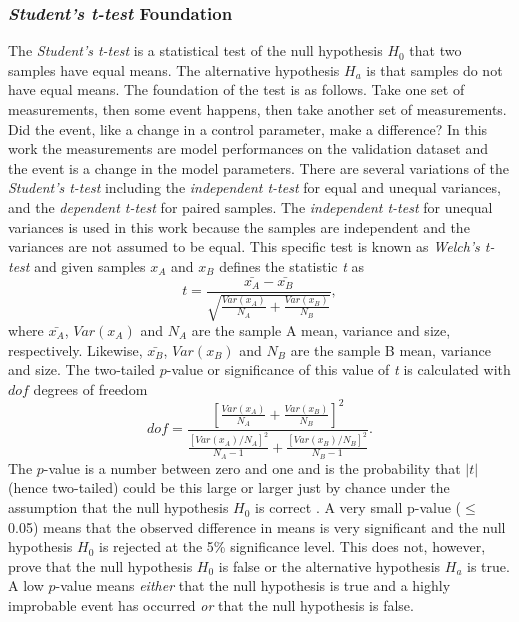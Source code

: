\subsubsection{\textit{Student's t-test} Foundation}
\label{sec:students_t-test}
The \textit{Student's t-test} is a statistical test of the null hypothesis $H_{0}$ that two samples have equal means. The alternative hypothesis $H_{a}$ is that samples do not have equal means. The foundation of the test is as follows. Take one set of measurements, then some event happens, then take another set of measurements. Did the event, like a change in a control parameter, make a difference? In this work the measurements are model performances on the validation dataset and the event is a change in the model parameters. There are several variations of the \textit{Student's t-test} including the \textit{independent t-test} for equal and unequal variances, and the \textit{dependent t-test} for paired samples. The \textit{independent t-test} for unequal variances is used in this work because the samples are independent and the variances are not assumed to be equal. This specific test is known as \textit{Welch's t-test} and given samples $x_{A}$ and $x_{B}$ defines the statistic \textit{t} as
\begin{equation} \label{eq:t_stat}
	t = \frac{\bar{x_{A}} - \bar{x_{B}}}{\sqrt{\frac{Var(x_{A})}{N_{A}} + \frac{Var(x_{B})}{N_{B}}}},
\end{equation}
where $\bar{x_{A}}$, $Var(x_{A})$ and $N_{A}$ are the sample A mean, variance and size, respectively. Likewise, $\bar{x_{B}}$, $Var(x_{B})$ and $N_{B}$ are the sample B mean, variance and size. The two-tailed $p$-value or significance of this value of \textit{t} is calculated with $dof$ degrees of freedom
\begin{equation} \label{eq:t_dof}
	dof = \frac{\left[\frac{Var(x_{A})}{N_{A}} + \frac{Var(x_{B})}{N_{B}}\right]^{2}}{\frac{\left[Var(x_{A})/N_{A}\right]^{2}}{N_{A} - 1} + \frac{\left[Var(x_{B})/N_{B}\right]^{2}}{N_{B} - 1}}.
\end{equation}
The $p$-value is a number between zero and one and is the probability that $|t|$ (hence two-tailed) could be this large or larger just by chance under the assumption that the null hypothesis $H_{0}$ is correct \cite{10.5555/1403886}. A very small p-value ($\le$ 0.05) means that the observed difference in means is very significant and the null hypothesis $H_{0}$ is rejected at the 5\% significance level. This does not, however, prove that the null hypothesis $H_{0}$ is false or the alternative hypothesis $H_{a}$ is true. A low $p$-value means \textit{either} that the null hypothesis is true and a highly improbable event has occurred \textit{or} that the null hypothesis is false.

